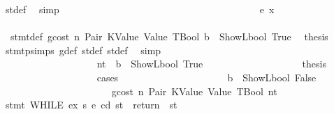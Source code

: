 \begin{isabellebody}
\ st{\isacharprime}{\kern0pt}{\isacharunderscore}{\kern0pt}def\ \isamarkupfalse%
\ simp\isanewline
\ \ \ \ \ \ \ \ \ \ \ \ \ \ \ \ \ \ \isamarkupfalse%
\isanewline
\ \ \ \ \ \ \ \ \ \ \ \ \ \ \ \ \ \ \ \ \isamarkupfalse%
\ {\isacharparenleft}{\kern0pt}e\ x{\isacharparenright}{\kern0pt}\isanewline
\ \ \ \ \ \ \ \ \ \ \ \ \ \ \ \ \ \ \ \ \isamarkupfalse%
\ {}{\isacharparenleft}{\kern0pt}{}{\isacharparenright}{\kern0pt}\ stmt{\isacharunderscore}{\kern0pt}def\ gcost\ n\ Pair\ KValue\ Value\ TBool\ {\isacharbackquoteopen}b\ {\isacharequal}{\kern0pt}\ ShowL\isactrlsub b\isactrlsub o\isactrlsub o\isactrlsub l\ True{\isacharbackquoteclose}\ \isamarkupfalse%
\ {\isacharquery}{\kern0pt}thesis\ \isamarkupfalse%
\ stmt{\isachardot}{\kern0pt}psimps{\isacharparenleft}{\kern0pt}{}{\isacharparenright}{\kern0pt}\ g{\isacharunderscore}{\kern0pt}def\ st{\isacharprime}{\kern0pt}{\isacharunderscore}{\kern0pt}def\ st{\isacharprime}{\kern0pt}{\isacharprime}{\kern0pt}{\isacharunderscore}{\kern0pt}def\ \isamarkupfalse%
\ simp\isanewline
\ \ \ \ \ \ \ \ \ \ \ \ \ \ \ \ \ \ \isamarkupfalse%
\isanewline
\ \ \ \ \ \ \ \ \ \ \ \ \ \ \ \ \isamarkupfalse%
\isanewline
\ \ \ \ \ \ \ \ \ \ \ \ \ \ \ \ \ \ \isamarkupfalse%
\ nt{\isacharcolon}{\kern0pt}\ {\isachardoublequoteopen}{\isasymnot}\ b\ {\isacharequal}{\kern0pt}\ ShowL\isactrlsub b\isactrlsub o\isactrlsub o\isactrlsub l\ True{\isachardoublequoteclose}\isanewline
\ \ \ \ \ \ \ \ \ \ \ \ \ \ \ \ \ \ \isamarkupfalse%
\ {\isacharquery}{\kern0pt}thesis\isanewline
\ \ \ \ \ \ \ \ \ \ \ \ \ \ \ \ \ \ \isamarkupfalse%
\ cases\isanewline
\ \ \ \ \ \ \ \ \ \ \ \ \ \ \ \ \ \ \ \ \isamarkupfalse%
\ {\isachardoublequoteopen}b\ {\isacharequal}{\kern0pt}\ ShowL\isactrlsub b\isactrlsub o\isactrlsub o\isactrlsub l\ False{\isachardoublequoteclose}\isanewline
\ \ \ \ \ \ \ \ \ \ \ \ \ \ \ \ \ \ \ \ \isamarkupfalse%
\ {}{\isacharparenleft}{\kern0pt}{}{\isacharparenright}{\kern0pt}\ gcost\ n\ Pair\ KValue\ Value\ TBool\ nt\ \isamarkupfalse%
\ {\isachardoublequoteopen}stmt\ {\isacharparenleft}{\kern0pt}WHILE\ ex\ s{}{\isacharparenright}{\kern0pt}\ e\ cd\ st\ {\isacharequal}{\kern0pt}\ return\ {\isacharparenleft}{\kern0pt}{\isacharparenright}{\kern0pt}\ st{\isacharprime}{\kern0pt}{\isacharprime}{\kern0pt}{\isachardoublequoteclose}\ \isamarkupfalse%

\end{isabellebody}
